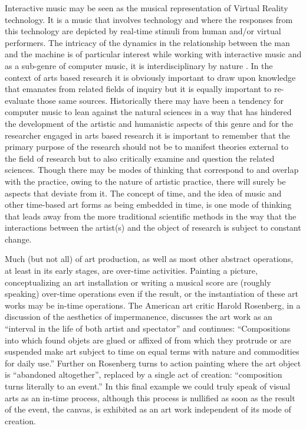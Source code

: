 Interactive music may be seen as the musical representation of Virtual Reality technology. It is a music that involves technology and where the responses from this technology are depicted by real-time stimuli from human and/or virtual performers. The intricacy of the dynamics in the relationship between the man and the machine is of particular interest while working with interactive music and as a sub-genre of computer music, it is interdisciplinary by nature \citep[24]{moore90}. In the context of arts based research it is obviously important to draw upon knowledge that emanates from related fields of inquiry but it is equally important to re-evaluate those same sources. Historically there may have been a tendency for computer music to lean against the natural sciences in a way that has hindered the development of the artistic and humanistic aspects of this genre and for the researcher engaged in arts based research it is important to remember that the primary purpose of the research should not be to manifest theories external to the field of research but to also critically examine and question the related sciences. Though there may be modes of thinking that correspond to and overlap with the practice, owing to the nature of artistic practice, there will surely be aspects that deviate from it. The concept of time, and the idea of music and other time-based art forms as being embedded in time, is one mode of thinking that leads away from the more traditional scientific methods in the way that the interactions between the artist(s) and the object of research is subject to constant change.

Much (but not all) of art production, as well as most other abstract operations, at least in its early stages, are over-time activities. Painting a picture, conceptualizing an art installation or writing a musical score are (roughly speaking) over-time operations even if the result, or the instantiation of these art works may be in-time operations. The American art critic Harold Rosenberg, in a discussion of the aesthetics of impermanence, discusses the art work as an ``interval in the life of both artist and spectator'' and continues: ``Compositions into which found objets are glued or affixed of from which they protrude or are suspended make art subject to time on equal terms with nature and commodities for daily use.'' \citep[92]{rosenberg66} Further on Rosenberg turns to action painting where the art object is ``abandoned altogether'', replaced by a single act of creation: ``composition turns literally to an event.'' \citep[93]{rosenberg66} In this final example we could truly speak of visual arts as an in-time process, although this process is nullified as soon as the result of the event, the canvas, is exhibited as an art work independent of its mode of creation.

